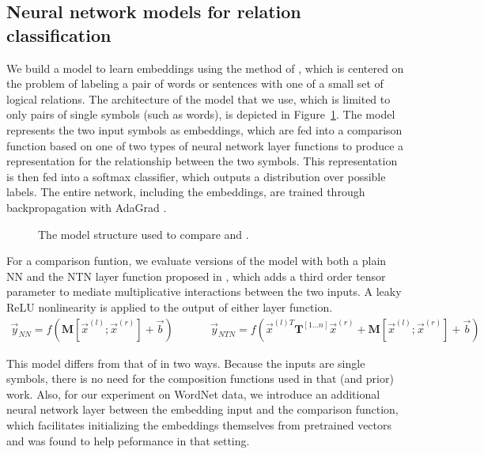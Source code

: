 
\subsection*{Neural network models for relation classification} \label{methods}



We build a model to learn embeddings using the method of
\citet{Bowman:Potts:Manning:2014}, which is centered on the problem of
labeling a pair of words or sentences with one of a small set of
logical relations. The architecture of the model that we use, which is
limited to only pairs of single symbols (such as words), is depicted
in Figure~\ref{sample-figure}. The model represents the two input
symbols as embeddings, which are fed into a comparison function based
on one of two types of neural network layer functions to produce a
representation for the relationship between the two symbols. This
representation is then fed into a softmax classifier, which outputs a
distribution over possible labels. The entire network, including the
embeddings, are trained through backpropagation with AdaGrad
\cite{duchi2011adaptive}.

\begin{figure}[tp]
  \centering
  
  \caption{The model structure used to compare  and .} 
  \label{sample-figure}
\end{figure}


For a comparison funtion, we evaluate versions of the model with both
a plain NN and the NTN layer function proposed in
\citet{chen2013learning}, which adds a third order tensor parameter to
mediate multiplicative interactions between the two inputs. A leaky
ReLU nonlinearity \cite{maasrectifier} is applied to the output of
either layer function.
%
\begin{gather} \label{rnn}
\vec{y}_{\textit{NN}} = f(\mathbf{M} [\vec{x}^{(l)}; \vec{x}^{(r)}] + \vec{b}) ~~~~~~~~~~~~~~~ \vec{y}_{\textit{NTN}} = f(\vec{x}^{(l)T} \mathbf{T}^{[1 \ldots n]} \vec{x}^{(r)} + \mathbf{M} [\vec{x}^{(l)}; \vec{x}^{(r)}] + \vec{b})
\end{gather} 
%

This model differs from that of \citet{Bowman:Potts:Manning:2014} in
two ways. Because the inputs are single symbols, there is no need for
the composition functions used in that (and prior) work. Also, for our
experiment on WordNet data, we introduce an additional neural network
layer between the embedding input and the comparison function, which
facilitates initializing the embeddings themselves from pretrained
vectors and was found to help peformance in that setting.



